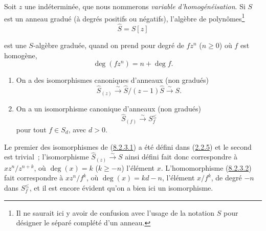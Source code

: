 \begin{env}[8.2.2]
\label{II.8.2.2-fr}
Soit $z$ une indéterminée, que nous nommerons \emph{variable
d'homogénéisation}. Si $S$ est un anneau gradué (à degrés positifs ou
négatifs), l'algèbre de polynômes\footnote{Il ne saurait ici y avoir de
confusion avec l'usage de la notation $\widehat{S}$ pour désigner le séparé
complété d'un anneau.}
\begin{equation}
\label{II.8.2.2.1-fr}
  \widehat{S}=S[z]
\tag{8.2.2.1}
\end{equation}

est une $S$-algèbre graduée, quand on prend pour degré de $fz^n$ ($n\geq0$) où
$f$ est homogène,
\begin{equation}
\label{II.8.2.2.2-fr}
  \deg(fz^n)=n+\deg f.
\tag{8.2.2.2}
\end{equation}
\end{env}

\begin{lemma}[8.2.3]
\label{II.8.2.3-fr}
\begin{enumerate}
\item[\rm(i)] On a des isomorphismes canoniques d'anneaux (non gradués)
\begin{equation}
\label{II.8.2.3.1-fr}
  \widehat{S}_{(z)}\xrightarrow{\sim}
  \widehat{S}/(z-1)\widehat{S}\xrightarrow{\sim}S.
\tag{8.2.3.1}
\end{equation}
\item[\rm(ii)] On a un isomorphisme canonique d'anneaux (non gradués)
\begin{equation}
\label{II.8.2.3.2-fr}
  \widehat{S}_{(f)}\xrightarrow{\sim}S_f^{\leq}
\tag{8.2.3.2}
\end{equation}
pour tout $f\in S_d$, avec $d>0$.
\end{enumerate}
\end{lemma}

Le premier des isomorphismes de (\hyperref[II.8.2.3.1-fr]{8.2.3.1}) a été
défini dans (\hyperref[II.2.2.5-fr]{2.2.5}) et le second est trivial~;
l'isomorphisme $\widehat{S}_{(z)}\xrightarrow{\sim}S$ ainsi défini fait donc
correspondre à $xz^n/z^{n+k}$, où $\deg(x)=k$ ($k\geq-n$) l'élément $x$.
L'homomorphisme (\hyperref[II.8.2.3.2-fr]{8.2.3.2}) fait correspondre à
$xz^n/f^k$, où $\deg(x)=kd-n$, l'élément $x/f^k$, de degré $-n$ dans
$S_f^{\leq}$, et il est encore évident qu'on a bien ici un isomorphisme.

